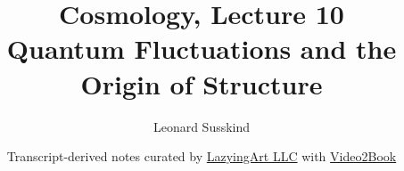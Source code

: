 \documentclass[11pt,oneside]{book}
\begin{document}
\hypersetup{pageanchor=false}
\frontmatter
\title{Cosmology, Lecture 10\\Quantum Fluctuations and the Origin of Structure}
\author{Leonard Susskind}
\date{Transcript-derived notes curated by \href{https://lazying.art}{LazyingArt LLC} with \href{https://github.com/lachlanchen/Video2Book}{Video2Book}}
\maketitle
\clearpage
\hypersetup{pageanchor=true}
\mainmatter

\end{document}
